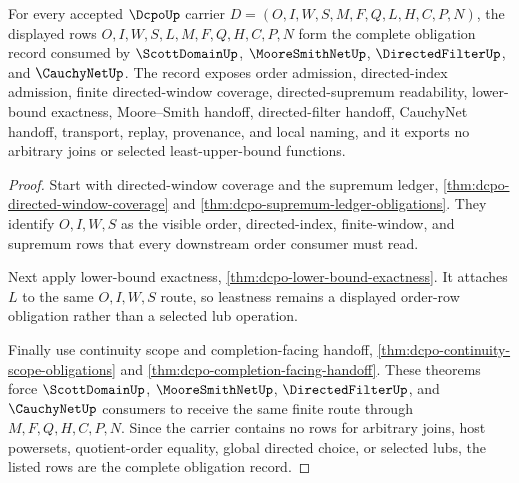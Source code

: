 \begin{theorem}
\label{thm:dcpo-obligation-closure-record}
For every accepted $\DcpoUp$ carrier $D=(O,I,W,S,M,F,Q,L,H,C,P,N)$, the displayed rows $O,I,W,S,L,M,F,Q,H,C,P,N$ form the complete obligation record consumed by $\ScottDomainUp$, $\MooreSmithNetUp$, $\DirectedFilterUp$, and $\CauchyNetUp$. The record exposes order admission, directed-index admission, finite directed-window coverage, directed-supremum readability, lower-bound exactness, Moore--Smith handoff, directed-filter handoff, CauchyNet handoff, transport, replay, provenance, and local naming, and it exports no arbitrary joins or selected least-upper-bound functions.
\end{theorem}
\begin{proof}
Start with directed-window coverage and the supremum ledger, \autoref{thm:dcpo-directed-window-coverage} and \autoref{thm:dcpo-supremum-ledger-obligations}. They identify $O,I,W,S$ as the visible order, directed-index, finite-window, and supremum rows that every downstream order consumer must read.

Next apply lower-bound exactness, \autoref{thm:dcpo-lower-bound-exactness}. It attaches $L$ to the same $O,I,W,S$ route, so leastness remains a displayed order-row obligation rather than a selected lub operation.

Finally use continuity scope and completion-facing handoff, \autoref{thm:dcpo-continuity-scope-obligations} and \autoref{thm:dcpo-completion-facing-handoff}. These theorems force $\ScottDomainUp$, $\MooreSmithNetUp$, $\DirectedFilterUp$, and $\CauchyNetUp$ consumers to receive the same finite route through $M,F,Q,H,C,P,N$. Since the carrier contains no rows for arbitrary joins, host powersets, quotient-order equality, global directed choice, or selected lubs, the listed rows are the complete obligation record.
\end{proof}


